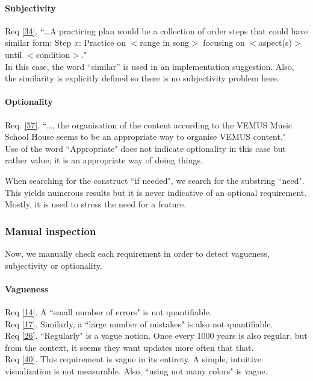 \documentclass[a4paper,twoside, twocolumn,11pt]{article}
\numberwithin{equation}{section}
\begin{document}
\paragraph{Subjectivity}
Req \ref{34}. ``\ldots A practicing plan would be a collection of order steps that could have similar form: Step $x$: Practice on $<$range in song$>$ focusing on $<$aspect(s)$>$ until $<$condition$>$."\\ 
In this case, the word ``similar'' is used in an implementation suggestion. Also, the similarity is explicitly defined so there is no subjectivity problem here.

\paragraph{Optionality}
Req. \ref{57}. ``\ldots, the organisation of the content according to the VEMUS Music School House seems to be an appropriate way to organise VEMUS content." \\
Use of the word ``Appropriate" does not indicate optionality in this case but rather value; it is an appropriate way of doing things.

When searching for the construct ``if needed", we search for the substring ``need". This yields numerous results but it is never indicative of an optional requirement. Mostly, it is used to stress the need for a feature.

\subsubsection{Manual inspection}
Now, we manually check each requirement in order to detect vagueness, subjectivity or optionality.

\paragraph{Vagueness} 
Req \ref{14}. A ``small number of errors" is not quantifiable.\\
Req \ref{17}. Similarly, a ``large number of mistakes" is also not quantifiable.\\
Req \ref{26}. ``Regularly" is a vague notion. Once every 1000 years is also regular, but from the context, it seems they want updates more often that that.\\
Req \ref{40}. This requirement is vague in its entirety. A simple, intuitive visualization is not measurable. Also, ``using not many colors" is vague.
\end{document}
